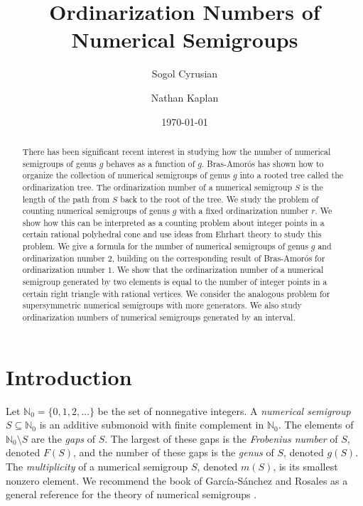 \documentclass[12pt]{amsart}
\title{Ordinarization Numbers of Numerical Semigroups}
\author{Sogol Cyrusian}
\author{Nathan Kaplan}
\date{\today}
\newcommand{\N}{{\mathbb N}}
\theoremstyle{plain}\newtheorem{proposition}{Proposition}[section]
\begin{document}
	
	
		\begin{abstract}
There has been significant recent interest in studying how the number of numerical semigroups of genus $g$ behaves as a function of $g$.  Bras-Amor\'os has shown how to organize the collection of numerical semigroups of genus $g$ into a rooted tree called the ordinarization tree.  The ordinarization number of a numerical semigroup $S$ is the length of the path from $S$ back to the root of the tree.  We study the problem of counting numerical semigroups of genus $g$ with a fixed ordinarization number $r$.  We show how this can be interpreted as a counting problem about integer points in a certain rational polyhedral cone and use ideas from Ehrhart theory to study this problem.  We give a formula for the number of numerical semigroups of genus $g$ and ordinarization number $2$, building on the corresponding result of Bras-Amor\'os for ordinarization number $1$.  We show that the ordinarization number of a numerical semigroup generated by two elements is equal to the number of integer points in a certain right triangle with rational vertices.  We consider the analogous problem for supersymmetric numerical semigroups with more generators.  We also study ordinarization numbers of numerical semigroups generated by an interval.
	\end{abstract}

	\maketitle


    
	\section{Introduction}

Let $\N_0 = \{0,1,2,\ldots\}$ be the set of nonnegative integers.  A \emph{numerical semigroup} $S \subseteq \N_0$ is an additive submonoid with finite complement in $\N_0$.  The elements of $\N_0 \setminus S$ are the \emph{gaps} of $S$.  The largest of these gaps is the \emph{Frobenius number} of $S$, denoted $F(S)$, and the number of these gaps is the \emph{genus} of $S$, denoted $g(S)$.  The \emph{multiplicity} of a numerical semigroup $S$, denoted $m(S)$, is its smallest nonzero element.  We recommend the book of Garc\'ia-S\'anchez and Rosales as a general reference for the theory of numerical semigroups \cite{GarciaSanchez_Rosales}.
\end{document}
